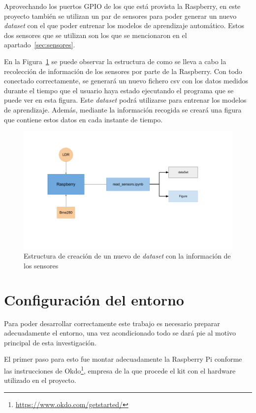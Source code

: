\documentclass[a4paper, 12pt]{book}
\begin{document}
Aprovechando los puertos GPIO de los que está provista la Raspberry, en este proyecto también se utilizan un par de sensores para poder generar un nuevo \textit{dataset} con el que poder entrenar los modelos de aprendizaje automático. Estos dos sensores que se utilizan son los que se mencionaron en el apartado~\ref{sec:sensores}.

En la Figura~\ref{fig:esquema_sensores} se puede observar la estructura de como se lleva a cabo la recolección de información de los sensores por parte de la Raspberry. Con todo conectado correctamente, se generará un nuevo fichero csv con los datos medidos durante el tiempo que el usuario haya estado ejecutando el programa que se puede ver en esta figura. Este \textit{dataset} podrá utilizarse para entrenar los modelos de aprendizaje. Además, mediante la información recogida se creará una figura que contiene estos datos en cada instante de tiempo.

\begin{figure}[]
  \centering
  \includegraphics[width=15cm, keepaspectratio]{img/esquema_sensores.png}
  \caption{Estructura de creación de un nuevo de \textit{dataset} con la información de los sensores}\label{fig:esquema_sensores}
\end{figure}


\section{Configuración del entorno}
\label{sec:configuracion_entorno}

Para poder desarrollar correctamente este trabajo es necesario preparar adecuadamente el entorno, una vez acondicionado todo se dará pie al motivo principal de esta investigación.

El primer paso para esto fue montar adecuadamente la Raspberry Pi conforme las instrucciones de Okdo\footnote{\url{https://www.okdo.com/getstarted/}}, empresa de la que procede el kit con el hardware utilizado en el proyecto.
\end{document}

